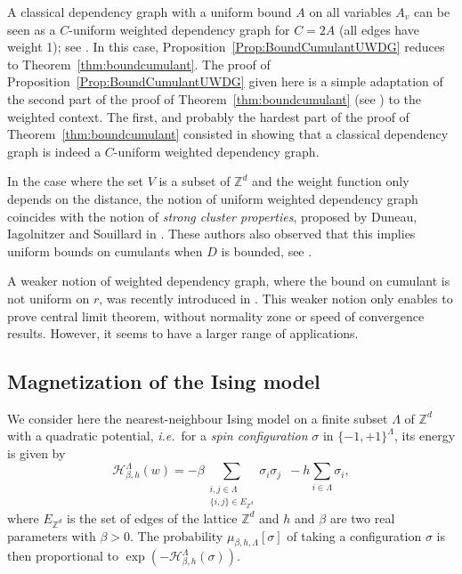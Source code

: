 \documentclass[envcountsame]{svmult}
\newcommand{\Z}{\mathbb{Z}}
\def\HHH{\mathcal{H}}
\begin{document}
\begin{remark}
  A classical dependency graph with a uniform bound $A$ on all variables $A_v$ can be seen as
  a $C$-uniform weighted dependency graph for $C=2A$ (all edges have weight 1);
  see \cite[Section 9.4]{FMN16}. 
  In this case, Proposition~\ref{Prop:BoundCumulantUWDG} reduces to Theorem~\ref{thm:boundcumulant}.
  The proof of Proposition~\ref{Prop:BoundCumulantUWDG} given here is a simple adaptation of the second part
  of the proof of Theorem~\ref{thm:boundcumulant} (see \cite[Chapter 9]{FMN16}) to the weighted context.
  The first, and probably the hardest part of the proof of Theorem~\ref{thm:boundcumulant}
  consisted in showing that a classical dependency graph is indeed a $C$-uniform weighted dependency graph.
\end{remark}

\begin{remark}
  In the case where the set $V$ is a subset of $\Z^d$ and the weight function only depends on the distance,
  the notion of uniform weighted dependency graph coincides with the notion of {\em strong cluster properties},
  proposed by Duneau, Iagolnitzer and Souillard in \cite{Duneau1}.
  These authors also observed that this implies uniform bounds on cumulants when $D$ is bounded,
  see \cite[Eq. (10)]{Duneau1}.
\end{remark}

\begin{remark}
  A weaker notion of weighted dependency graph, where the bound on cumulant is not uniform on $r$,
  was recently introduced in \cite{WDG}.
  This weaker notion only enables to prove central limit theorem, 
  without normality zone or speed of convergence results.
  However, it seems to have a larger range of applications.
\end{remark}



\subsection{Magnetization of the Ising model}
\label{subsec:Ising}
We consider here the nearest-neighbour Ising model on a finite subset $\Lambda$ of $\Z^d$ with a quadratic potential,
\emph{i.e.}~for a {\em spin configuration} $\sigma$ in $\{-1,+1\}^{\Lambda}$, its energy is given by
\[\HHH^\Lambda_{\beta,h}(w)=  - \beta\!\!\! \sum_{\substack{ i,j \in \Lambda \\ \{i,j\} \in E_{\Z^d}}} \!\!\! \sigma_i\sigma_j\,\,\,-h \sum_{i \in \Lambda} \sigma_i,\]
where $E_{\Z^d}$ is the set of edges of the lattice $\Z^d$ and $h$ and $\beta$ are two real parameters with $\beta > 0$.
The probability $\mu_{\beta,h,\Lambda}[\sigma]$ of taking a configuration $\sigma$ is then proportional to $\exp(- \HHH^\Lambda_{\beta,h}(\sigma))$.\medskip
\end{document}
